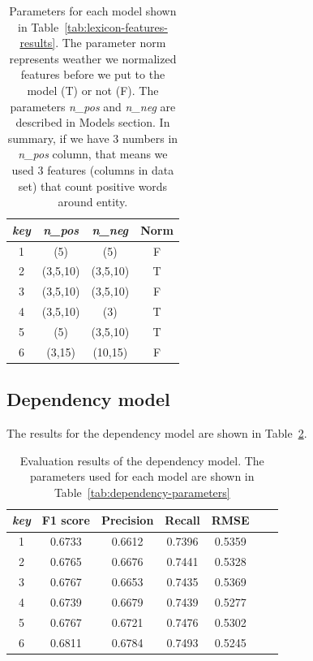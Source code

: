 \documentclass[11pt,a4paper]{article}
\begin{document}
\begin{table}[h]
\centering
\begin{tabular}{cccc}
\emph{key} & \emph{n\_pos} & \emph{n\_neg} & Norm \\ \hline
1 & (5) & (5) & F  \\
2 & (3,5,10) & (3,5,10) & T \\
3 & (3,5,10) & (3,5,10) & F  \\
4 & (3,5,10) & (3) & T  \\
5 & (5) & (3,5,10) & T  \\
6 & (3,15) & (10,15) & F \\
\end{tabular}
\caption{Parameters for each model shown in Table~\ref{tab:lexicon-features-results}.
        The parameter norm represents weather we normalized features before we put to the model (T) or not (F). The parameters \emph{n\_pos} and \emph{n\_neg} are described in Models section. In summary, if we have 3 numbers in \emph{n\_pos} column, that means we used 3 features (columns in data set) that count positive words around entity. }
\label{tab:lexicon-features-parameters}
\end{table}

\subsection{Dependency model}

The results for the dependency model are shown in Table~\ref{tab:dependency-results}.


\begin{table}[h]
\centering
\begin{tabular}{ccccccc}
\emph{key} & F1 score & Precision & Recall & RMSE   \\ \hline
1 & 0.6733   & 0.6612    & 0.7396 & 0.5359 \\ %
2 & 0.6765   & 0.6676    & 0.7441 & 0.5328 \\ %
3 & 0.6767   & 0.6653    & 0.7435 & 0.5369 \\ %
4 & 0.6739   & 0.6679    & 0.7439 & 0.5277 \\ %
5 & 0.6767   & 0.6721    & 0.7476 & 0.5302 \\ %
6 & 0.6811   & 0.6784    & 0.7493 & 0.5245 \\ %
\end{tabular}
\caption{Evaluation results of the dependency model. The parameters used for each model are shown in Table~\ref{tab:dependency-parameters}}
\label{tab:dependency-results}
\end{table}
\end{document}

